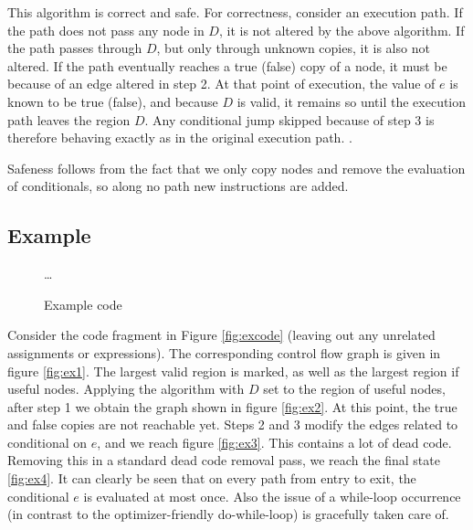 \documentclass[halfparskip]{scrartcl}
\begin{document}
This algorithm is correct and safe. For correctness, consider an execution path. If the path does not pass any node in $D$, it is not altered by the above algorithm. If the path passes through $D$, but only through unknown copies, it is also not altered. If the path eventually reaches a true (false) copy of a node, it must be because of an edge altered in step 2. At that point of execution, the value of $e$ is known to be true (false), and because $D$ is valid, it remains so until the execution path leaves the region $D$. Any conditional jump skipped because of step 3 is therefore behaving exactly as in the original execution path.
.

Safeness follows from the fact that we only copy nodes and remove the evaluation of conditionals, so along no path new instructions are added.

\subsection*{Example}

\begin{wrapfigure}{R}{0.4\linewidth}
\begin{algorithm}[H]
{\ldots}
\end{algorithm}
\caption{Example code}
\label{fig:excode}
\end{wrapfigure}


Consider the code fragment in Figure \vref{fig:excode} (leaving out any unrelated assignments or expressions).
The corresponding control flow graph is given in figure \vref{fig:ex1}. The largest valid region is marked, as well as the largest region if useful nodes. Applying the algorithm with $D$ set to the region of useful nodes, after step 1 we obtain the graph shown in figure \vref{fig:ex2}. At this point, the true and false copies are not reachable yet. Steps 2 and 3 modify the edges related to conditional on $e$, and we reach figure \vref{fig:ex3}. This contains a lot of dead code. Removing this in a standard dead code removal pass, we reach the final state \vref{fig:ex4}. It can clearly be seen that on every path from entry to exit, the conditional $e$ is evaluated at most once. Also the issue of a while-loop occurrence (in contrast to the optimizer-friendly do-while-loop) is gracefully taken care of.
\end{document}
